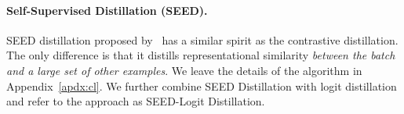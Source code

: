
\paragraph{Self-Supervised Distillation (SEED).} SEED distillation proposed by~\cite{Fang2021SEEDSD} has a similar spirit as the contrastive distillation. The only difference is that it distills representational similarity \textit{between the batch and a large set of other examples}. We leave the details of the algorithm in Appendix~\ref{apdx:cl}. %
We further combine SEED Distillation%
with logit distillation and refer to the approach as SEED-Logit Distillation.

